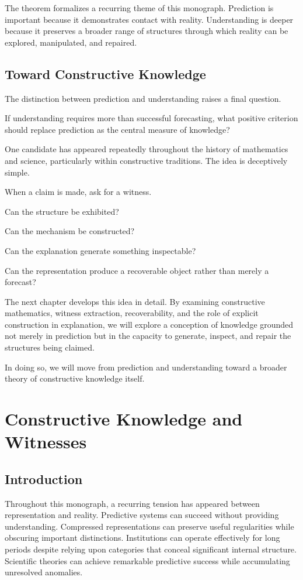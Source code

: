 \documentclass[11pt,oneside,openany]{book}
\begin{document}
The theorem formalizes a recurring theme of this monograph. Prediction is important because it demonstrates contact with reality. Understanding is deeper because it preserves a broader range of structures through which reality can be explored, manipulated, and repaired.

\section{Toward Constructive Knowledge}

The distinction between prediction and understanding raises a final question.

If understanding requires more than successful forecasting, what positive criterion should replace prediction as the central measure of knowledge?

One candidate has appeared repeatedly throughout the history of mathematics and science, particularly within constructive traditions. The idea is deceptively simple.

When a claim is made, ask for a witness.

Can the structure be exhibited?

Can the mechanism be constructed?

Can the explanation generate something inspectable?

Can the representation produce a recoverable object rather than merely a forecast?

The next chapter develops this idea in detail. By examining constructive mathematics, witness extraction, recoverability, and the role of explicit construction in explanation, we will explore a conception of knowledge grounded not merely in prediction but in the capacity to generate, inspect, and repair the structures being claimed.

In doing so, we will move from prediction and understanding toward a broader theory of constructive knowledge itself.

\chapter{Constructive Knowledge and Witnesses}

\section{Introduction}

Throughout this monograph, a recurring tension has appeared between representation and reality. Predictive systems can succeed without providing understanding. Compressed representations can preserve useful regularities while obscuring important distinctions. Institutions can operate effectively for long periods despite relying upon categories that conceal significant internal structure. Scientific theories can achieve remarkable predictive success while accumulating unresolved anomalies.
\end{document}
